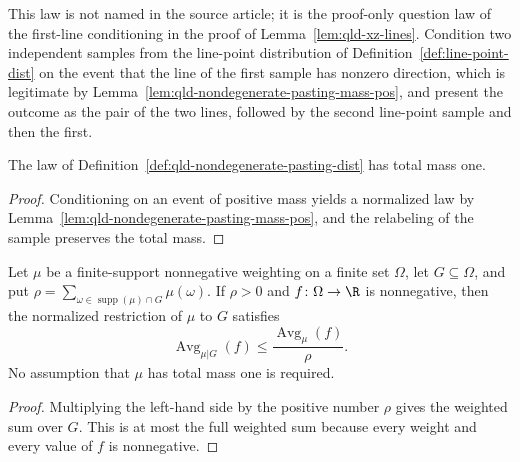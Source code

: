 	\begin{definition}
		\label{def:qld-nondegenerate-pasting-dist}
		\leanok
		This law is not named in the source article; it is the proof-only question
		law of the first-line conditioning in the proof of
		Lemma~\ref{lem:qld-xz-lines}. Condition two independent samples from the
		line-point distribution of Definition~\ref{def:line-point-dist} on the
		event that the line of the first sample has nonzero direction, which is
		legitimate by Lemma~\ref{lem:qld-nondegenerate-pasting-mass-pos}, and
		present the outcome as the pair of the two lines, followed by the second
		line-point sample and then the first.
	\end{definition}

	\begin{lemma}
		\label{lem:qld-nondegenerate-pasting-dist-prob}
		\leanok
		The law of Definition~\ref{def:qld-nondegenerate-pasting-dist} has total
		mass one.
	\end{lemma}
	\begin{proof}
		\leanok
		Conditioning on an event of positive mass yields a normalized law by
		Lemma~\ref{lem:qld-nondegenerate-pasting-mass-pos}, and the relabeling of
		the sample preserves the total mass.
	\end{proof}

	\begin{lemma}
		\label{lem:qld-restricted-average-le-div-mass}
		\leanok
		Let $\mu$ be a finite-support nonnegative weighting on a finite set $\Omega$,
		let $G\subseteq\Omega$, and put
		$\rho=\sum_{\omega\in\operatorname{supp}(\mu)\cap G}\mu(\omega)$.
		If $\rho>0$ and $f\colon\Omega\to\R$ is nonnegative, then the normalized
		restriction of $\mu$ to $G$ satisfies
		\[
			\operatorname{Avg}_{\mu|G}(f)
			\leq \frac{\operatorname{Avg}_{\mu}(f)}{\rho}.
		\]
		No assumption that $\mu$ has total mass one is required.
	\end{lemma}
	\begin{proof}
		\leanok
		Multiplying the left-hand side by the positive number $\rho$ gives the
		weighted sum over $G$. This is at most the full weighted sum because every
		weight and every value of $f$ is nonnegative.
	\end{proof}

